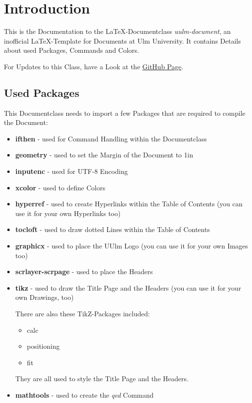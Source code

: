 \documentclass[a4paper]{../uulm-document}
\begin{document}
\maketitle
\tableofcontents

\section{Introduction}
This is the Documentation to the \LaTeX -Documentclass \textit{uulm-document}, an inofficial \LaTeX -Template for Documents at Ulm University. It contains Details about used Packages, Commands and Colors.

For Updates to this Class, have a Look at the \href{https://github.com/JensOstertag/uulm-document}{GitHub Page}.

\subsection{Used Packages}
This Documentclass needs to import a few Packages that are required to compile the Document:
\begin{itemize}
\item \textbf{ifthen} - used for Command Handling within the Documentclass
\item \textbf{geometry} - used to set the Margin of the Document to 1in
\item \textbf{inputenc} - used for UTF-8 Encoding
\item \textbf{xcolor} - used to define Colors
\item \textbf{hyperref} - used to create Hyperlinks within the Table of Contents (you can use it for your own Hyperlinks too)
\item \textbf{tocloft} - used to draw dotted Lines within the Table of Contents
\item \textbf{graphicx} - used to place the UUlm Logo (you can use it for your own Images too)
\item \textbf{scrlayer-scrpage} - used to place the Headers
\item \textbf{tikz} - used to draw the Title Page and the Headers (you can use it for your own Drawings, too)

There are also these TikZ-Packages included:
\begin{itemize}
\item calc
\item positioning
\item fit
\end{itemize}
They are all used to style the Title Page and the Headers.
\item \textbf{mathtools} - used to create the \textit{qed} Command
\end{itemize}
\end{document}
